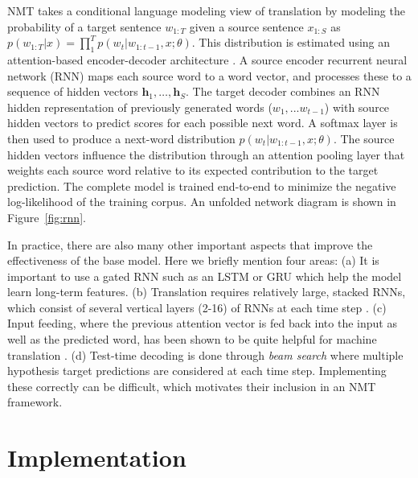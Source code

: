 \documentclass[11pt,a4paper]{article}
\begin{document}
NMT takes a conditional language modeling view of translation by modeling the
probability of a target sentence $w_{1:T}$ given a source sentence
$x_{1:S}$ as
$p(w_{1:T}| x) = \prod_{1}^T p(w_t| w_{1:t-1}, x; \theta)$. This
distribution is estimated using an attention-based encoder-decoder
architecture \cite{Bahdanau2015}. A source encoder recurrent neural
network (RNN) maps each source word to a word vector, and processes
these to a sequence of hidden vectors
$\mathbf{h}_1, \ldots, \mathbf{h}_S$.  The target decoder combines an
RNN hidden representation of previously generated words
($w_1, ... w_{t-1}$) with source hidden vectors to predict scores for
each possible next word. A softmax layer is then used to produce a
next-word distribution $ p(w_t| w_{1:t-1}, x; \theta)$. The source
hidden vectors influence the distribution through an attention pooling
layer that weights each source word relative to its expected
contribution to the target prediction. The complete model is trained
end-to-end to minimize the negative log-likelihood of the training
corpus. An unfolded network diagram is shown in Figure~\ref{fig:rnn}.


In practice, there are also many other important aspects that improve
the effectiveness of the base model. Here we briefly mention four
areas: (a) It is important to use a gated RNN such as an LSTM
\cite{hochreiter1997long} or GRU \cite{chung2014empirical} which help
the model learn long-term features. (b) Translation requires
relatively large, stacked RNNs, which consist of several vertical
layers (2-16) of RNNs at each time step \cite{sutskever14sequence}. (c)
Input feeding, where the previous attention vector is fed back into
the input as well as the predicted word, has been shown to be quite
helpful for machine translation \cite{Luong2015}.  (d) Test-time
decoding is done through \textit{beam search} where multiple
hypothesis target predictions are considered at each time
step. Implementing these correctly can be difficult, which motivates
their inclusion in an NMT framework.






\section{Implementation}
\end{document}
